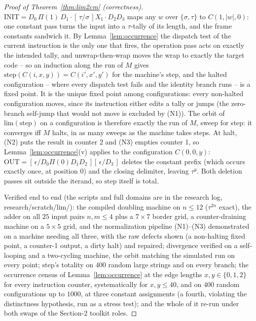 \begin{proof}[Proof of Theorem~\ref{thm:lim2cm} (correctness)]
    $\mathrm{INIT} = D_0\,\Pi(1)\,D_1\cdot[\,\tau/\sigma\,]X_1\cdot D_2 D_3$
    maps any $w$ over $\{\sigma, \tau\}$ to $C(1, |w|, 0)$: one constant
    pass turns the input into a $\tau$-tally of its length, and the
    frame constants sandwich it. By Lemma~\ref{lem:occurrence} the
    dispatch test of the current instruction is the only one that
    fires, the operation pass acts on exactly the intended tally, and
    unwrap-then-wrap moves the wrap to exactly the target code -- so an
    induction along the run of $M$ gives
    $\mathrm{step}(C(i, x, y)) = C(i', x', y')$ for the machine's step,
    and the halted configuration -- where every dispatch test fails and
    the identity branch runs -- is a fixed point. It is the unique
    fixed point among configurations: every non-halted configuration
    moves, since its instruction either edits a tally or jumps (the
    zero-branch self-jump that would not move is excluded by (N1)).
    The orbit of $\mathrm{lim}(\mathrm{step})$ on a configuration is
    therefore exactly the run of $M$, sweep for step: it converges iff
    $M$ halts, in as many sweeps as the machine takes steps. At halt,
    (N2) puts the result in counter 2 and (N3) empties counter 1, so
    Lemma~\ref{lem:occurrence}(v) applies to the configuration
    $C(0, 0, y)$: $\mathrm{OUT} =
    [\,\epsilon/D_0\Pi(0)D_1D_2\,][\,\epsilon/D_3\,]$ deletes the
    constant prefix (which occurs exactly once, at position $0$) and
    the closing delimiter, leaving $\tau^{y}$. Both deletion passes sit
    outside the iterand, so $\mathrm{step}$ itself is total.

    Verified end to end (the scripts and full domains are in the
    research log, research/scratch/lim/): the compiled doubling machine
    on $n \leq 12$ ($\tau^{2n}$ exact), the adder on all $25$ input
    pairs $n, m \leq 4$ plus a $7 \times 7$ border grid, a
    counter-draining machine on a $5 \times 5$ grid, and the
    normalization pipeline (N1)--(N3) demonstrated on a machine
    needing all three, with the raw defects shown (a non-halting fixed
    point, a counter-1 output, a dirty halt) and repaired; divergence
    verified on a self-looping and a two-cycling machine, the orbit
    matching the simulated run on every point; $\mathrm{step}$'s
    totality on $400$ random large strings and on every branch; the
    occurrence census of Lemma~\ref{lem:occurrence} at the edge
    lengths $x, y \in \{0, 1, 2\}$ for every instruction counter,
    systematically for $x, y \leq 40$, and on $400$ random
    configurations up to $1000$, at three constant assignments (a
    fourth, violating the distinctness hypothesis, run as a stress
    test); and the whole of it re-run under both swaps of the
    Section-2 toolkit roles.
\end{proof}

